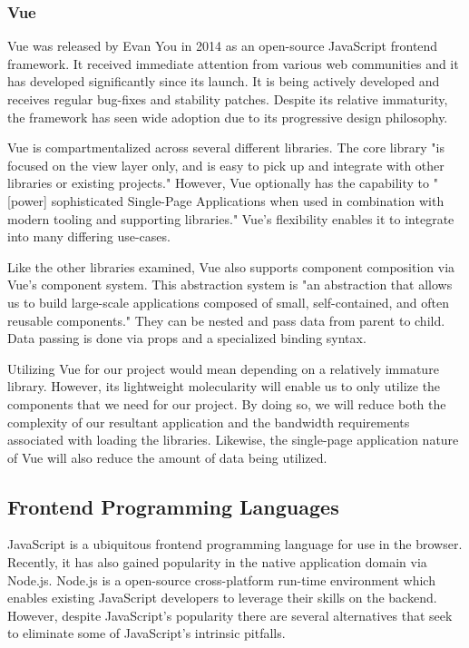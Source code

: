 \documentclass[12pt]{report}
\begin{document}
\begin{enumerate}
\subsubsection*{Vue}

Vue was released by Evan You in 2014 as an open-source JavaScript frontend framework.\cite{vuelaunch} It received immediate attention from various web communities and it has developed significantly since its launch. It is being actively developed and receives regular bug-fixes and stability patches. Despite its relative immaturity, the framework has seen wide adoption due to its progressive design philosophy.

Vue is compartmentalized across several different libraries. The core library "is focused on the view layer only, and is easy to pick up and integrate with other libraries or existing projects." \cite{vueguide} However, Vue optionally has the capability to "[power] sophisticated Single-Page Applications when used in combination with modern tooling and supporting libraries."\cite{vueguide} Vue's flexibility enables it to integrate into many differing use-cases.

Like the other libraries examined, Vue also supports component composition via Vue's component system. This abstraction system is "an abstraction that allows us to build large-scale applications composed of small, self-contained, and often reusable components."\cite{vueguide} They can be nested and pass data from parent to child. Data passing is done via props and a specialized binding syntax.

Utilizing Vue for our project would mean depending on a relatively immature library. However, its lightweight molecularity will enable us to only utilize the components that we need for our project. By doing so, we will reduce both the complexity of our resultant application and the bandwidth requirements associated with loading the libraries. Likewise, the single-page application nature of Vue will also reduce the amount of data being utilized.

\subsection*{Frontend Programming Languages}

JavaScript is a ubiquitous frontend programming language for use in the browser. Recently, it has also gained popularity in the native application domain via Node.js. Node.js is a open-source cross-platform run-time environment which enables existing JavaScript developers to leverage their skills on the backend. However, despite JavaScript's popularity there are several alternatives that seek to eliminate some of JavaScript's intrinsic pitfalls.


\end{enumerate}
\end{document}
